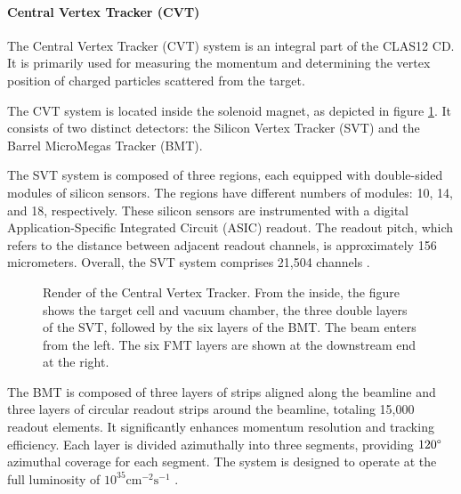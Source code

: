 \paragraph{Central Vertex Tracker (CVT)}
    The Central Vertex Tracker (CVT) system is an integral part of the CLAS12 CD.
    It is primarily used for measuring the momentum and determining the vertex position of charged particles scattered from the target.

    The CVT system is located inside the solenoid magnet, as depicted in figure \ref{fig::cvt}.
    It consists of two distinct detectors: the Silicon Vertex Tracker (SVT) and the Barrel MicroMegas Tracker (BMT).

    The SVT system is composed of three regions, each equipped with double-sided modules of silicon sensors.
    The regions have different numbers of modules: 10, 14, and 18, respectively.
    These silicon sensors are instrumented with a digital Application-Specific Integrated Circuit (ASIC) readout.
    The readout pitch, which refers to the distance between adjacent readout channels, is approximately 156 micrometers.
    Overall, the SVT system comprises 21,504 channels \cite{antonioli2020}.

    \begin{figure}
        \centering{}
        \caption[CVT]{Render of the Central Vertex Tracker.
        From the inside, the figure shows the target cell and vacuum chamber, the three double layers of the SVT, followed by the six layers of the BMT.
        The beam enters from the left.
        The six FMT layers are shown at the downstream end at the right.}
        \label{fig::cvt}
    \end{figure}

    The BMT is composed of three layers of strips aligned along the beamline and three layers of circular readout strips around the beamline, totaling 15,000 readout elements.
    It significantly enhances momentum resolution and tracking efficiency.
    Each layer is divided azimuthally into three segments, providing $120\degree$ azimuthal coverage for each segment.
    The system is designed to operate at the full luminosity of $10^{35} \text{cm}^{-2}\text{s}^{-1}$ \cite{acker2020mvt}.
